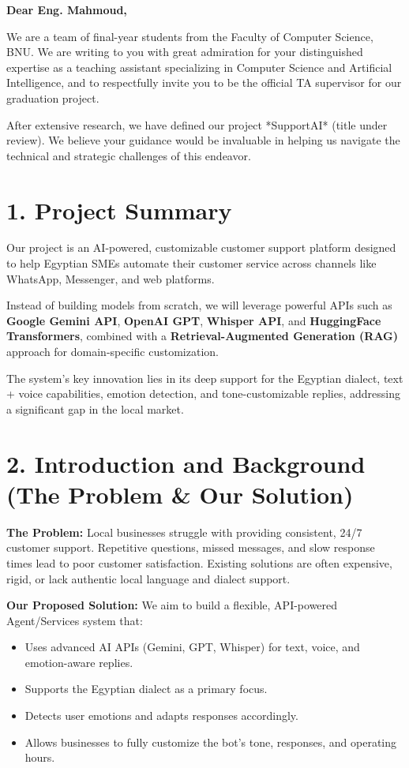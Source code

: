 \documentclass[12pt,a4paper]{article}
\begin{document}
\begin{flushleft}
\textbf{Dear Eng. Mahmoud,} \\
\end{flushleft}

We are a team of final-year students from the Faculty of Computer Science, BNU.  
We are writing to you with great admiration for your distinguished expertise as a teaching assistant
specializing in Computer Science and Artificial Intelligence, and to respectfully invite you 
to be the official TA supervisor for our graduation project.  

After extensive research, we have defined our project *SupportAI* (title under review).  
We believe your guidance would be invaluable in helping us navigate the technical 
and strategic challenges of this endeavor.

\section*{1. Project Summary}
Our project is an AI-powered, customizable customer support platform designed to help 
Egyptian SMEs automate their customer service across channels like WhatsApp, Messenger, 
and web platforms.  

Instead of building models from scratch, we will leverage powerful APIs such as 
\textbf{Google Gemini API}, \textbf{OpenAI GPT}, \textbf{Whisper API}, and 
\textbf{HuggingFace Transformers}, combined with a \textbf{Retrieval-Augmented Generation (RAG)} 
approach for domain-specific customization.  

The system's key innovation lies in its deep support for the Egyptian dialect, 
text + voice capabilities, emotion detection, and tone-customizable replies, 
addressing a significant gap in the local market.  

\section*{2. Introduction and Background (The Problem \& Our Solution)}

\textbf{The Problem:}  
Local businesses struggle with providing consistent, 24/7 customer support. 
Repetitive questions, missed messages, and slow response times lead to poor 
customer satisfaction. Existing solutions are often expensive, rigid, or 
lack authentic local language and dialect support.  

\textbf{Our Proposed Solution:}  
We aim to build a flexible, API-powered Agent/Services system that:
\begin{itemize}[leftmargin=*]
    \item Uses advanced AI APIs (Gemini, GPT, Whisper) for text, voice, and emotion-aware replies.  
    \item Supports the Egyptian dialect as a primary focus.  
    \item Detects user emotions and adapts responses accordingly.  
    \item Allows businesses to fully customize the bot’s tone, responses, and operating hours.  
\end{itemize}
\end{document}
